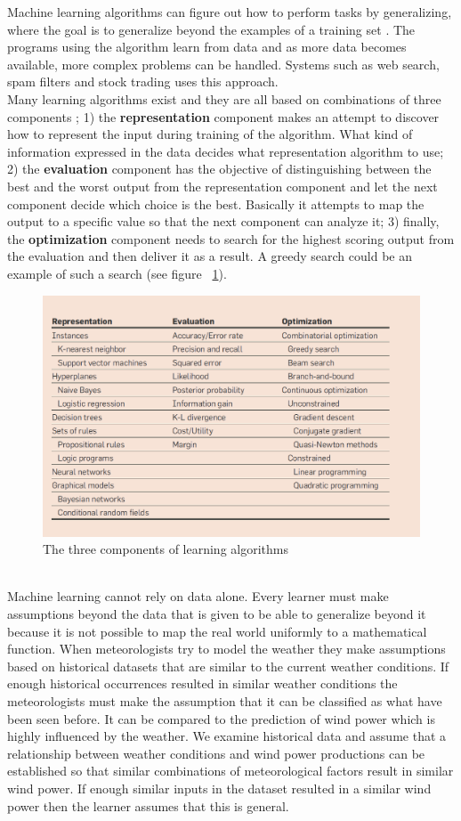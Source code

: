Machine learning algorithms can figure out how to perform tasks by generalizing, where the goal is to generalize beyond the examples of a training set \cite{18}. The programs using the algorithm learn from data and as more data becomes available, more complex problems can be handled. Systems such as web search, spam filters and stock trading uses this approach.
\\[0.5cm]
Many learning algorithms exist and they are all based on combinations of three components \cite{18}; 1) the \textbf{representation} component makes an attempt to discover how to represent the input during training of the algorithm. What kind of information expressed in the data decides what representation algorithm to use; 2) the \textbf{evaluation} component has the objective of distinguishing between the best and the worst output from the representation component and let the next component decide which choice is the best. Basically it attempts to map the output to a specific value so that the next component can analyze it; 3) finally, the \textbf{optimization} component needs to search for the highest scoring output from the evaluation and then deliver it as a result. A greedy search could be an example of such a search (see figure ~\ref{fig:threeComponents}).
\begin{figure}[!ht]
\centering
\includegraphics[width=0.6\linewidth,natwidth=898,natheight=587]{billeder/Table1-TheComponentsOfLearningAlgorithms.png}
\caption{The three components of learning algorithms \cite{18}}
\label{fig:threeComponents}
\end{figure}
\\[0.5cm] 
Machine learning cannot rely on data alone. Every learner must make assumptions beyond the data that is given to be able to generalize beyond it \cite{18} because it is not possible to map the real world uniformly to a mathematical function. When meteorologists try to model the weather they make assumptions based on historical datasets that are similar to the current weather conditions. If enough historical occurrences resulted in similar weather conditions the meteorologists must make the assumption that it can be classified as what have been seen before. It can be compared to the prediction of wind power which is highly influenced by the weather. We examine historical data and assume that a relationship between weather conditions and wind power productions can be established so that similar combinations of meteorological factors result in similar wind power. If enough similar inputs in the dataset resulted in a similar wind power then the learner assumes that this is general.
